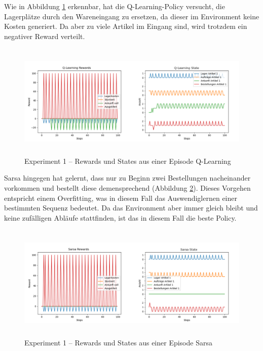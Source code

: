 \newpage
Wie in Abbildung \ref{fig:e1-pol-q} erkennbar, hat die Q-Learning-Policy versucht, die Lagerplätze durch den Wareneingang zu ersetzen, da dieser im Environment keine Kosten generiert. Da aber zu viele Artikel im Eingang sind, wird trotzdem ein negativer Reward verteilt. 

\begin{figure}[H]
  \centering
  \includegraphics[height=5.5cm]{img/plots/exp-1/q-rew-state.png}
  \caption{Experiment 1 – Rewards und States aus einer Episode Q-Learning}
    \label{fig:e1-pol-q}
\end{figure}
Sarsa hingegen hat gelernt, dass nur zu Beginn zwei Bestellungen nacheinander vorkommen und bestellt diese demensprechend (Abbildung \ref{fig:e1-pol-sarsa}). Dieses Vorgehen entspricht einem Overfitting, was in diesem Fall das Auswendiglernen einer bestimmten Sequenz bedeutet. Da das Environment aber immer gleich bleibt und keine zufälligen Abläufe stattfinden, ist das in diesem Fall die beste Policy.
\begin{figure}[H]
  \centering
  \includegraphics[height=5.5cm]{img/plots/exp-1/sarsa-rew-state.png}
  \caption{Experiment 1 – Rewards und States aus einer Episode Sarsa}
    \label{fig:e1-pol-sarsa}
\end{figure}